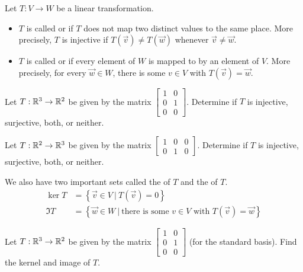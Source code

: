 
\begin{applicationActivities}{2}{19}

\begin{definition}
Let $T: V \rightarrow W$ be a linear transformation.
\begin{itemize}
\item $T$ is called  or  if $T$ does not map two distinct values to the same place.  More precisely, $T$ is injective if $T(\vec{v}) \neq T(\vec{w})$ whenever $\vec{v} \neq \vec{w}$.
\item $T$ is called  or  if every element of $W$ is mapped to by an element of $V$.  More precisely, for every $\vec{w} \in W$, there is some $v \in V$ with $T(\vec{v})=\vec{w}$.
\end{itemize}
\end{definition}

\begin{activity}{0}
Let $T: \mathbb{R}^3 \rightarrow \mathbb{R}^2$ be given by the matrix $\begin{bmatrix} 1 & 0 \\ 0 & 1 \\ 0 & 0 \end{bmatrix}$.  Determine if $T$ is injective, surjective, both, or neither.
\end{activity}

\begin{activity}{0}
Let $T: \mathbb{R}^2 \rightarrow \mathbb{R}^3$ be given by the matrix $\begin{bmatrix} 1 & 0 &0  \\ 0 & 1 & 0 \end{bmatrix}$.  Determine if $T$ is injective, surjective, both, or neither.
\end{activity}

\begin{definition}
We also have two important sets called the  of $T$ and the  of $T$.
\begin{align*}
\ker T &= \left\{ \vec{v} \in V\ \big|\ T(\vec{v})=0\right\} \\
\Im T &= \left\{ \vec{w} \in W\ \big|\ \text{there is some }v\in V \text{ with } T(\vec{v})=\vec{w}\right\}
\end{align*}
\end{definition}

\begin{activity}{0}
Let $T: \mathbb{R}^3 \rightarrow \mathbb{R}^2$ be given by the matrix $\begin{bmatrix} 1 & 0 \\ 0 & 1 \\ 0 & 0 \end{bmatrix}$ (for the standard basis).  Find the kernel and image of $T$.
\end{activity}


\end{applicationActivities}
